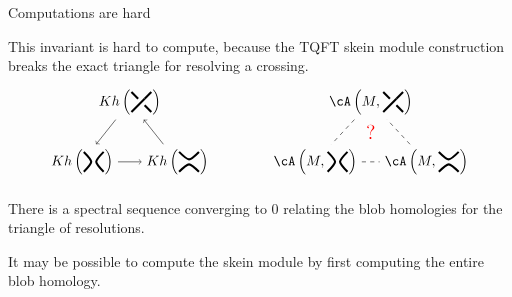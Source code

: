 \documentclass[beamer, compress]{beamer}
\begin{document}
\begin{frame}{Computations are hard}
\begin{block}{}
This invariant is hard to compute, because the TQFT skein module construction breaks the exact triangle for resolving a crossing.
\vspace{-0.3cm}
\begin{align*}
\begin{tikzpicture}
\node(a) at (0,0) {$Kh\left(\begin{tikzpicture}[baseline=-2.5pt, scale=0.5, line width=1.5pt]
\node[outer sep=-1pt] (x) at (0,0){};
    \draw (x.45)-- (.5,.5);
    \draw (x.135) -- (-.5,.5);
    \draw (x.315) -- (.5,-.5);
    \draw (x.45) -- (-.5,-.5);
\end{tikzpicture}\right)$};
\node(b) at (-1.2,-1.5) {$Kh\left(\begin{tikzpicture}[baseline=-2.5pt, scale=0.5, line width=1.5pt]
    \draw (1.5,.5) .. controls (2,0) .. (1.5,-.5);
    \draw (2.5,.5) .. controls (2,0) .. (2.5,-.5);
\end{tikzpicture}\right)$};
\node(c) at (1.2,-1.5) {$Kh\left(\begin{tikzpicture}[baseline=-2.5pt, scale=0.5, line width=1.5pt]
    \draw (3.5,.5) .. controls (4,0) .. (4.5,.5);
    \draw (3.5,-.5) .. controls (4,0) .. (4.5,-.5);
\end{tikzpicture}\right)$};
\draw[->] (a) -- (b);
\draw[->] (b) -- (c);
\draw[->] (c) -- (a);
\end{tikzpicture}
\qquad \qquad
\begin{tikzpicture}
\node(a) at (0,0) {$\cA\left(M, \begin{tikzpicture}[baseline=-2.5pt, scale=0.5, line width=1.5pt]
\node[outer sep=-1pt] (x) at (0,0){};
    \draw (x.45)-- (.5,.5);
    \draw (x.135) -- (-.5,.5);
    \draw (x.315) -- (.5,-.5);
    \draw (x.45) -- (-.5,-.5);
\end{tikzpicture}\right)$};
\node(b) at (-1.4,-1.5) {$\cA\left(M, \begin{tikzpicture}[baseline=-2.5pt, scale=0.5, line width=1.5pt]
    \draw (1.5,.5) .. controls (2,0) .. (1.5,-.5);
    \draw (2.5,.5) .. controls (2,0) .. (2.5,-.5);
\end{tikzpicture}\right)$};
\node(c) at (1.4,-1.5) {$\cA\left(M,\begin{tikzpicture}[baseline=-2.5pt, scale=0.5, line width=1.5pt]
    \draw (3.5,.5) .. controls (4,0) .. (4.5,.5);
    \draw (3.5,-.5) .. controls (4,0) .. (4.5,-.5);
\end{tikzpicture}\right)$};
\node at (0,-0.75) {\Large \color{red} ?};
\draw[dashed] (a) -- (b);
\draw[dashed] (b) -- (c);
\draw[dashed] (c) -- (a);
\end{tikzpicture}
\end{align*}\vspace{-1cm}
\end{block}
There is a spectral sequence converging to $0$ relating the blob homologies for the triangle of resolutions. 
\begin{conj}
It may be possible to compute the skein module
by first computing the entire blob homology.
\end{conj}
\end{frame}
\end{document}
